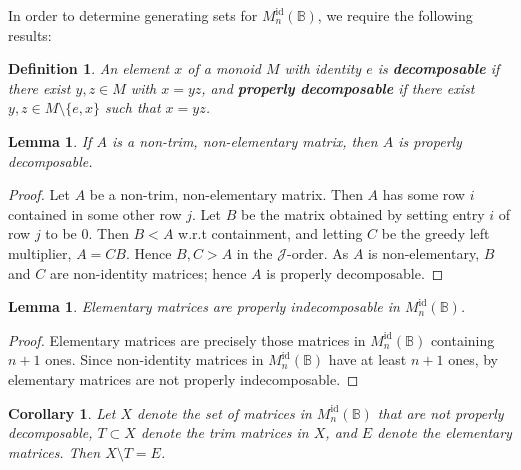 \documentclass[11pt]{article}
\newtheorem{cor}[thm]{Corollary}
\newtheorem{lemma}[thm]{Lemma}
\newtheorem{defi}[thm]{Definition}
\newcommand{\defn}[1]{\textbf{\textit{#1}}}
\numberwithin{equation}{section}
\newcommand{\B}{\mathbb{B}}
\newcommand{\Refn}{M_n^{\text{id}}(\B)}
\newcommand{\J}{\mathscr{J}}
\begin{document}
In order to determine generating sets for $\Refn$, we require the following results:

\begin{defi}
  An element $x$ of a monoid $M$ with identity $e$ is \defn{decomposable} if
  there exist $y, z \in M$ with $x = yz$, and \defn{properly decomposable} if
  there exist $y, z \in M\setminus\{e, x\}$ such that $x = yz$.
\end{defi}

\begin{lemma}
  If $A$ is a non-trim, non-elementary matrix, then $A$ is properly
  decomposable.
\end{lemma}
\begin{proof}
Let $A$ be a non-trim, non-elementary matrix. Then $A$ has some row $i$
contained in some other row $j$. Let $B$ be the matrix obtained by setting entry
$i$ of row $j$ to be $0$. Then $B < A$ w.r.t containment, and letting $C$ be the
greedy left multiplier, $A = CB$. Hence $B, C > A$ in the $\J$-order. As $A$ is
non-elementary, $B$ and $C$ are non-identity matrices; hence $A$ is properly
decomposable.
\end{proof}

\begin{lemma}
  Elementary matrices are properly indecomposable in $\Refn$.
\end{lemma}
\begin{proof}
  Elementary matrices are precisely those matrices in $\Refn$ containing $n + 1$
  ones. Since non-identity matrices in $\Refn$ have at least $n + 1$ ones, by
   elementary matrices are not properly
  indecomposable.
\end{proof}

\begin{cor}
  Let $X$ denote the set of matrices in $\Refn$ that are not properly
  decomposable, $T \subset X$ denote the trim matrices in $X$, and $E$ denote
  the elementary matrices. Then $X \setminus T = E$. 
\end{cor}
\end{document}
